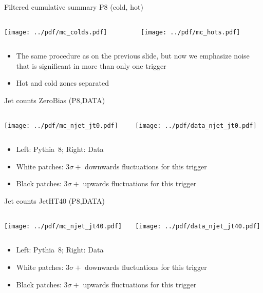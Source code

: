 \documentclass[9pt]{beamer}
\begin{document}
\begin{frame}[t]{Filtered cumulative summary P8 (cold, hot)}
\begin{columns}[T]
  \begin{column}{.5\textwidth}
  \texttt{[image: ../pdf/mc\_colds.pdf]}
  \end{column}
  \begin{column}{.5\textwidth}
  \texttt{[image: ../pdf/mc\_hots.pdf]}
  \end{column}
\end{columns}
\begin{itemize}
 \item The same procedure as on the previous slide, but now we emphasize noise that is significant in more than only one trigger
 \item Hot and cold zones separated
\end{itemize}
\end{frame}

\begin{frame}[t]{Jet counts ZeroBias (P8,DATA)}
\begin{columns}[T]
  \begin{column}{.5\textwidth}
  \texttt{[image: ../pdf/mc\_njet\_jt0.pdf]}
  \end{column}
  \begin{column}{.5\textwidth}
  \texttt{[image: ../pdf/data\_njet\_jt0.pdf]}
  \end{column}
\end{columns}
\begin{itemize}
 \item Left: Pythia~8; Right: Data
 \item White patches: $3\sigma+$ downwards fluctuations for this trigger
 \item Black patches: $3\sigma+$ upwards fluctuations for this trigger
\end{itemize}
\end{frame}

\begin{frame}[t]{Jet counts JetHT40 (P8,DATA)}
\begin{columns}[T]
  \begin{column}{.5\textwidth}
  \texttt{[image: ../pdf/mc\_njet\_jt40.pdf]}
  \end{column}
  \begin{column}{.5\textwidth}
  \texttt{[image: ../pdf/data\_njet\_jt40.pdf]}
  \end{column}
\end{columns}
\begin{itemize}
 \item Left: Pythia~8; Right: Data
 \item White patches: $3\sigma+$ downwards fluctuations for this trigger
 \item Black patches: $3\sigma+$ upwards fluctuations for this trigger
\end{itemize}
\end{frame}
\end{document}
